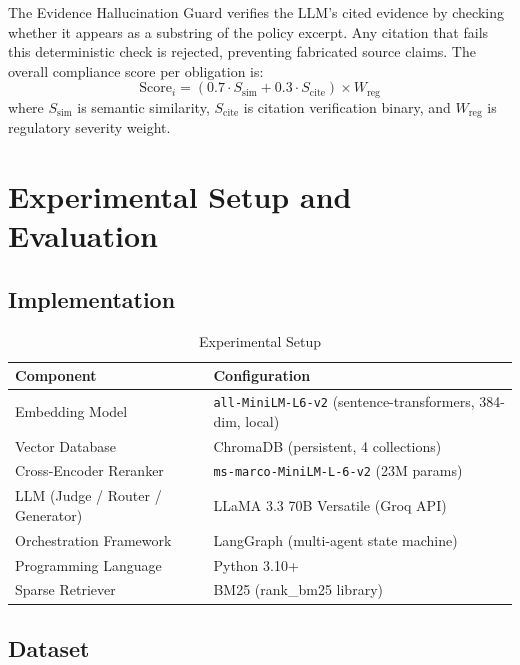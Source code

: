 \documentclass[conference, a4paper]{IEEEtran}
\begin{document}
The Evidence Hallucination Guard verifies the LLM's cited evidence by checking whether it appears
as a substring of the policy excerpt. Any citation that fails this deterministic check is rejected,
preventing fabricated source claims. The overall compliance score per obligation is:
\begin{equation}
\mathrm{Score}_i = (0.7 \cdot S_\mathrm{sim} + 0.3 \cdot S_\mathrm{cite}) \times W_\mathrm{reg}
\end{equation}
where $S_\mathrm{sim}$ is semantic similarity, $S_\mathrm{cite}$ is citation verification binary,
and $W_\mathrm{reg}$ is regulatory severity weight.

\section{Experimental Setup and Evaluation}

\subsection{Implementation}

\begin{table}[htbp]
\centering
\caption{Experimental Setup}
\label{tab:setup}
\begin{tabularx}{\columnwidth}{>{\raggedright\arraybackslash}X >{\raggedright\arraybackslash}X}
\toprule
\textbf{Component} & \textbf{Configuration} \\
\midrule
Embedding Model & \texttt{all-MiniLM-L6-v2} (sentence-transformers, 384-dim, local) \\
Vector Database & ChromaDB (persistent, 4 collections) \\
Cross-Encoder Reranker & \texttt{ms-marco-MiniLM-L-6-v2} (23M params) \\
LLM (Judge / Router / Generator) & LLaMA 3.3 70B Versatile (Groq API) \\
Orchestration Framework & LangGraph (multi-agent state machine) \\
Programming Language & Python 3.10+ \\
Sparse Retriever & BM25 (rank\_bm25 library) \\
\bottomrule
\end{tabularx}
\end{table}

\subsection{Dataset}
\end{document}
